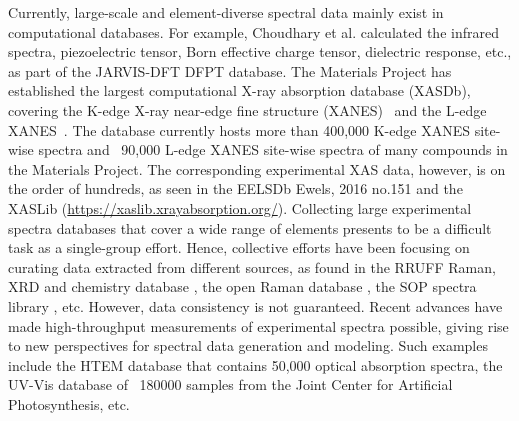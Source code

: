 \documentclass[pdflatex,sn-mathphys]{sn-jnl}%
\theoremstyle{thmstyleone}%
\theoremstyle{thmstyletwo}%
\theoremstyle{thmstylethree}%
\begin{document}
Currently, large-scale and element-diverse spectral data mainly exist in computational databases. For example, Choudhary et al. \cite{Choudhary.2020.no.148} calculated the infrared spectra, piezoelectric tensor, Born effective charge tensor, dielectric response, etc., as part of the JARVIS-DFT DFPT database. The Materials Project has established the largest computational X-ray absorption database (XASDb), covering the K-edge X-ray near-edge fine structure (XANES)~\cite{Mathew.2018.no.149} and the L-edge XANES~\cite{Chen.2021.no.150}. The database currently hosts more than 400,000 K-edge XANES site-wise spectra and ~90,000 L-edge XANES site-wise spectra of many compounds in the Materials Project. The corresponding experimental XAS data, however, is on the order of hundreds, as seen in the EELSDb {Ewels, 2016 no.151} and the XASLib (\url{https://xaslib.xrayabsorption.org/}). Collecting large experimental spectra databases that cover a wide range of elements presents to be a difficult task as a single-group effort. Hence, collective efforts have been focusing on curating data extracted from different sources, as found in the RRUFF Raman, XRD and chemistry database \cite{Lafuente.2015.no.152}, the open Raman database \cite{El.Mendili.2019.no.153}, the SOP spectra library \cite{Fremout.2012.no.154}, etc. However, data consistency is not guaranteed.  Recent advances have made high-throughput measurements of experimental spectra possible, giving rise to new perspectives for spectral data generation and modeling. Such examples include the HTEM database \cite{Zakutayev.2018.no.143} that contains 50,000 optical absorption spectra, the UV-Vis database of ~180000 samples from the Joint Center for Artificial Photosynthesis, etc.  
\end{document}
